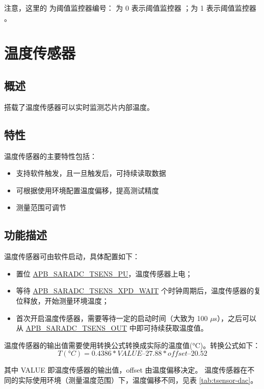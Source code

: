 \documentclass[main\_\_CN.tex]{subfiles}
\begin{document}
注意，这里的  为阈值监控器编号： 为 0 表示阈值监控器 ；为 1 表示阈值监控器 。



\section{温度传感器}\label{sec:tsensor}
\subsection{概述}
\chipname{} 搭载了温度传感器可以实时监测芯片内部温度。

\subsection{特性}
温度传感器的主要特性包括：
\begin{itemize}
    \item 支持软件触发，且一旦触发后，可持续读取数据
    \item 可根据使用环境配置温度偏移，提高测试精度
    \item 测量范围可调节
\end{itemize}


\subsection{功能描述}

温度传感器可由软件启动，具体配置如下：
    \begin{itemize}
        \item 置位 \hyperref[fielddesc:APBSARADCTSENSPU]{APB\_SARADC\_TSENS\_PU}，温度传感器上电；
        \item 等待 \hyperref[fielddesc:APBSARADCTSENSXPDWAIT]{APB\_SARADC\_TSENS\_XPD\_WAIT} 个时钟周期后，温度传感器的复位释放，开始测量环境温度；
        \item 首次开启温度传感器，需要等待一定的启动时间（大致为 100 $\mu$s），之后可以从 \hyperref[fielddesc:APBSARADCTSENSOUT]{APB\_SARADC\_TSENS\_OUT} 中即可持续获取温度值。
    \end{itemize}

温度传感器的输出值需要使用转换公式转换成实际的温度值(°C)。转换公式如下：
\[
        T(°C) = 0.4386 * VALUE – 27.88 * offset – 20.52
\]

其中 VALUE 即温度传感器的输出值，offset 由温度偏移决定。 温度传感器在不同的实际使用环境（测量温度范围）下，温度偏移不同，见表 \ref{tab:tsensor-dac}。
\end{document}
